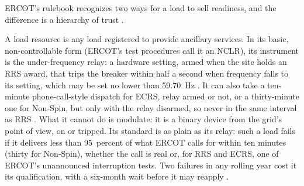 ERCOT's rulebook recognizes two ways for a load to sell readiness, and the difference is a hierarchy of trust \autocite{ercot2026protocols,potomac2024som}. %

A load resource is any load registered to provide ancillary services. In its basic, non-controllable form (ERCOT's test procedures call it an NCLR), its instrument is the under-frequency relay: a hardware setting, armed when the site holds an RRS award, that trips the breaker within half a second when frequency falls to its setting, which may be set no lower than 59.70~Hz \autocite{ercotnclrtest2026,ercotnog2026}. %
It can also take a ten-minute phone-call-style dispatch for ECRS, relay armed or not, or a thirty-minute one for Non-Spin, but only with the relay disarmed, so never in the same interval as RRS \autocite{ercot2026protocols,ercotnclrtest2026}. %
What it cannot do is modulate: it is a binary device from the grid's point of view, on or tripped.
Its standard is as plain as its relay: such a load fails if it delivers less than 95~percent of what ERCOT calls for within ten minutes (thirty for Non-Spin), whether the call is real or, for RRS and ECRS, one of ERCOT's unannounced interruption tests. Two failures in any rolling year cost it its qualification, with a six-month wait before it may reapply \autocite{ercot2026protocols}. %

